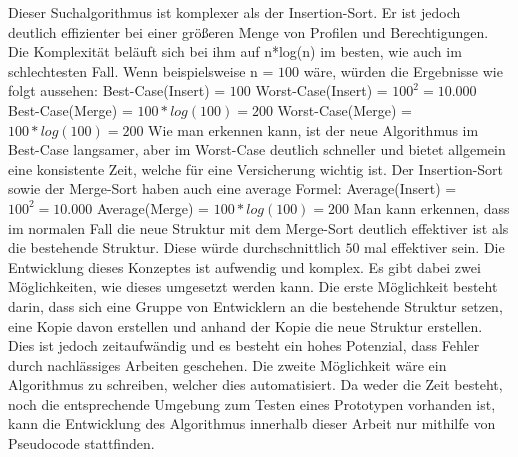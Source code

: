 Dieser Suchalgorithmus ist komplexer als der Insertion-Sort. Er ist jedoch deutlich effizienter bei einer größeren Menge von Profilen und Berechtigungen.
Die Komplexität beläuft sich bei ihm auf n*log(n) im besten, wie auch im schlechtesten Fall. \cite[12]{log} \cite{weblogMer}
\newline
Wenn beispielsweise n = $100$ wäre, würden die Ergebnisse wie folgt aussehen:
\newline
\newline
Best-Case(Insert) = $100$
\newline
Worst-Case(Insert) = $100^2 = 10.000$
\newline
\newline
Best-Case(Merge) = $100*log(100) = 200$
\newline
Worst-Case(Merge) = $100*log(100) = 200$
\newline
\newline
Wie man erkennen kann, ist der neue Algorithmus im Best-Case langsamer, aber im Worst-Case deutlich schneller und bietet allgemein eine konsistente Zeit, welche für eine Versicherung wichtig ist.
Der Insertion-Sort sowie der Merge-Sort haben auch eine average Formel: \cite{weblogMer,weblogIn}
\newline
\newline
Average(Insert) = $100^2 = 10.000$
\newline
\newline
Average(Merge) = $100*log(100) = 200$
\newline
\newline
Man kann erkennen, dass im normalen Fall die neue Struktur mit dem Merge-Sort deutlich effektiver ist als die bestehende Struktur.
Diese würde durchschnittlich $50$ mal effektiver sein.
\newline
\newline
Die Entwicklung dieses Konzeptes ist aufwendig und komplex.
Es gibt dabei zwei Möglichkeiten, wie dieses umgesetzt werden kann.
Die erste Möglichkeit besteht darin, dass sich eine Gruppe von Entwicklern an die bestehende Struktur setzen, eine Kopie davon erstellen und anhand der Kopie die neue Struktur erstellen.
Dies ist jedoch zeitaufwändig und es besteht ein hohes Potenzial, dass Fehler durch nachlässiges Arbeiten geschehen.
\newline
Die zweite Möglichkeit wäre ein Algorithmus zu schreiben, welcher dies automatisiert.
Da weder die Zeit besteht, noch die entsprechende Umgebung zum Testen eines Prototypen vorhanden ist, kann die Entwicklung des Algorithmus innerhalb dieser Arbeit nur mithilfe von Pseudocode stattfinden.
